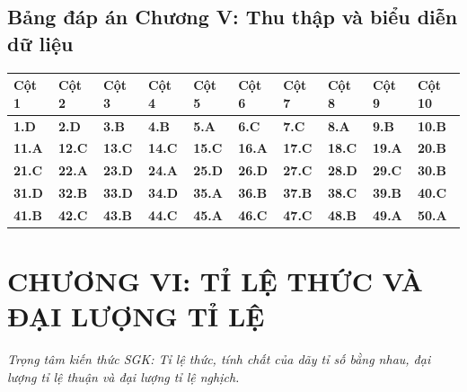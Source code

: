 \documentclass[11pt,a4paper]{article}
\begin{document}
\subsection*{\color{primary} Bảng đáp án Chương V: Thu thập và biểu diễn dữ liệu}
\begin{center}
\renewcommand{\arraystretch}{1.25}
\begin{tabularx}{\textwidth}{*{10}{>{\centering\arraybackslash}X}}
\toprule
\textbf{\color{primary} Cột 1} & \textbf{\color{primary} Cột 2} & \textbf{\color{primary} Cột 3} & \textbf{\color{primary} Cột 4} & \textbf{\color{primary} Cột 5} & \textbf{\color{primary} Cột 6} & \textbf{\color{primary} Cột 7} & \textbf{\color{primary} Cột 8} & \textbf{\color{primary} Cột 9} & \textbf{\color{primary} Cột 10} \\
\midrule
\textbf{1.D} & \textbf{2.D} & \textbf{3.B} & \textbf{4.B} & \textbf{5.A} & \textbf{6.C} & \textbf{7.C} & \textbf{8.A} & \textbf{9.B} & \textbf{10.B} \\
\rowcolor{rowtint} \textbf{11.A} & \textbf{12.C} & \textbf{13.C} & \textbf{14.C} & \textbf{15.C} & \textbf{16.A} & \textbf{17.C} & \textbf{18.C} & \textbf{19.A} & \textbf{20.B} \\
\textbf{21.C} & \textbf{22.A} & \textbf{23.D} & \textbf{24.A} & \textbf{25.D} & \textbf{26.D} & \textbf{27.C} & \textbf{28.D} & \textbf{29.C} & \textbf{30.B} \\
\rowcolor{rowtint} \textbf{31.D} & \textbf{32.B} & \textbf{33.D} & \textbf{34.D} & \textbf{35.A} & \textbf{36.B} & \textbf{37.B} & \textbf{38.C} & \textbf{39.B} & \textbf{40.C} \\
\textbf{41.B} & \textbf{42.C} & \textbf{43.B} & \textbf{44.C} & \textbf{45.A} & \textbf{46.C} & \textbf{47.C} & \textbf{48.B} & \textbf{49.A} & \textbf{50.A} \\
\bottomrule
\end{tabularx}
\end{center}\vspace{10pt}
\section*{\color{primary} CHƯƠNG VI: TỈ LỆ THỨC VÀ ĐẠI LƯỢNG TỈ LỆ}
\textit{Trọng tâm kiến thức SGK: Tỉ lệ thức, tính chất của dãy tỉ số bằng nhau, đại lượng tỉ lệ thuận và đại lượng tỉ lệ nghịch.}\par\vspace{4pt}
\end{document}
